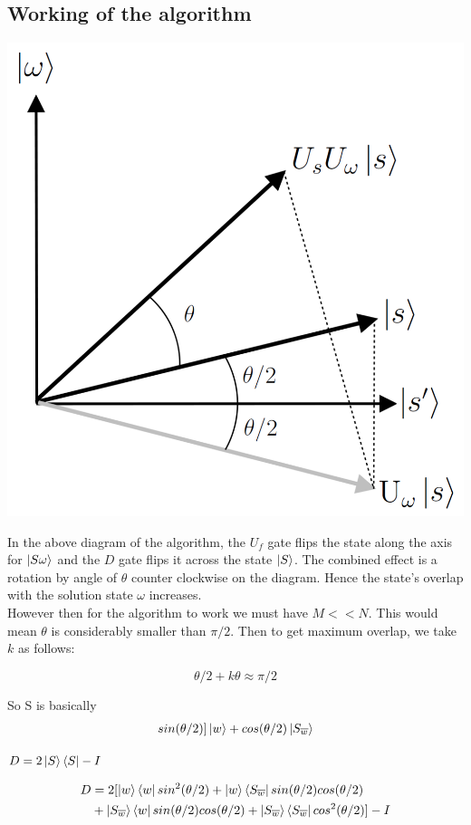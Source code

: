 \documentclass{article}
\begin{document}
\subsection{Working of the algorithm}

{
	\centering
	\includegraphics[width = 8 cm]{image.png}\par
}

In the above diagram of the algorithm, the $U_f$ gate flips the state along the axis for
$\ket{S\omega}$ and the $D$ gate flips it across the state $\ket{S}$. The combined effect is
a rotation by angle of $\theta$ counter clockwise on the diagram. Hence the state's overlap
with the solution state $\omega$ increases. \\

However then for the algorithm to work we must have $M << N$. This would mean $\theta$ is
considerably smaller than $\pi/2$. Then to get maximum overlap, we take $k$ as follows:

$$\theta/2 + k\theta \approx \pi/2$$



So S is basically 
\begin{align*}
    sin(\theta/2)]\ket{w} + cos(\theta/2)\ket{S_{\overline{w}}}
\end{align*}

$D=2\ket{S}\bra{S}-I$
\raggedright
\begin{align*}
D &= 2[ \ket{w}\bra{w}sin^2(\theta/2) + \ket{w}\bra{S_{\overline{w}}}sin(\theta/2)cos(\theta/2) \\&+ \ket{S_{\overline{w}}}\bra{w}sin(\theta/2)cos(\theta/2)+ \ket{S_{\overline{w}}}\bra{S_{\overline{w}}}cos^2(\theta/2) ] - I
\end{align*}
\end{document}
